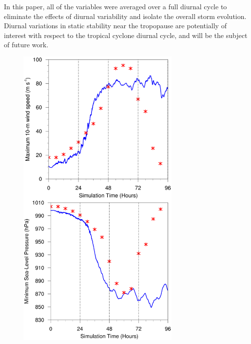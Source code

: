 In this paper, all of the variables were averaged over a full diurnal cycle to eliminate the effects of diurnal variability and isolate the overall storm evolution.
Diurnal variations in static stability near the tropopause are potentially of interest with respect to the tropical cyclone diurnal cycle, and will be the subject of future work.

\begin{figure}[ht]
\centerline{\includegraphics[width=19pc]{figures/vmax+pmin.png}}

\end{figure}
